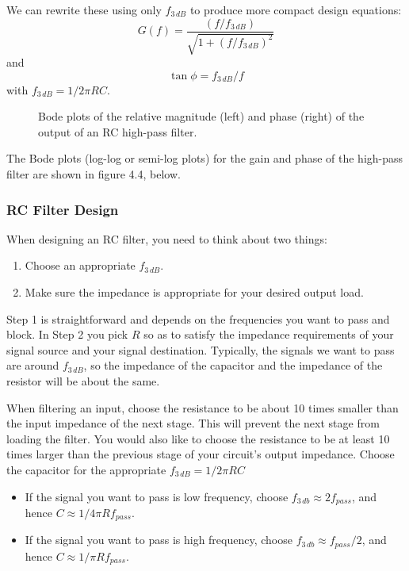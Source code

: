 \documentclass{article}
\begin{document}
We can rewrite these using only $f_{3\,dB}$ to produce more compact design equations:
\begin{equation}
G(f) = \frac{(f/f_{3\,dB})}{\sqrt{1 + (f/f_{3\,dB})^2}}
\end{equation}
and
\begin{equation}
\tan\phi = f_{3\,dB}/f
\end{equation}
with $f_{3\,dB} = 1/2\pi RC$.

\begin{figure}
\begin{center}
\quad
{}
\end{center}
\caption{Bode plots of the relative magnitude (left) and phase (right) of the output of an RC high-pass filter.}
\label{fig:rc_high_pass_filter_bode_plot}
\end{figure}

The Bode plots (log-log or semi-log plots) for the gain and phase of the high-pass filter are shown in figure 4.4, below. 

\subsubsection{RC Filter Design}

When designing an RC filter, you need to think about two things:
\begin{enumerate}
\item Choose an appropriate $f_{3\,dB}$.
\item Make sure the impedance is appropriate for your desired output load.
\end{enumerate}
Step 1 is straightforward and depends on the frequencies you want to pass and block.  In Step 2 you pick $R$ so as to satisfy the impedance requirements of your signal source and your signal destination. Typically, the signals we want to pass are around $f_{3\,dB}$, so the impedance of the capacitor and the impedance of the resistor will be about the same.

When filtering an input, choose the resistance to be about 10 times smaller than the input impedance of the next stage. This will prevent the next stage from loading the filter. You would also like to choose the resistance to be at least 10 times larger than the previous stage of your circuit's output impedance.
Choose the capacitor for the appropriate $f_{3\,dB} = 1/2\pi RC$
\begin{itemize}
\item If the signal you want to pass is low frequency, choose $f_{3\,db} \approx 2 f_{pass}$, and hence $C \approx 1/4\pi R f_{pass}$.
\item If the signal you want to pass is high frequency, choose $f_{3\,db} \approx f_{pass}/2$, and hence $C \approx 1/\pi R f_{pass}$.
\end{itemize}
\end{document}
